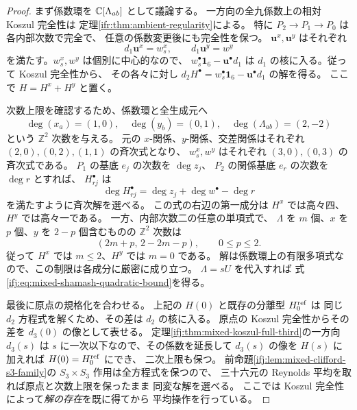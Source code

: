 \begin{proof}
まず係数環を $\mathbb C[\Lambda_{ab}]$ として議論する。
一方向の全九係数上の相対 Koszul 完全性は
定理\ref{ifr:thm:ambient-regularity}による。
特に $P_2\to P_1\to P_0$ は各内部次数で完全で、
任意の係数変更後にも完全性を保つ。
$\mathbf u^x,\mathbf u^y$ はそれぞれ
\[
 d_1\mathbf u^x=w_s^x,\qquad d_1\mathbf u^y=w^y
\]
を満たす。$w_s^x,w^y$ は個別に中心的なので、
$w_s^\bullet\mathbf1_6-\mathbf u^\bullet d_1$ は
$d_1$ の核に入る。従って Koszul 完全性から、
その各々に対し $d_2H^\bullet
 =w_s^\bullet\mathbf1_6-\mathbf u^\bullet d_1$ の解を得る。
ここで $H=H^x+H^y$ と置く。

次数上限を確認するため、係数環と全生成元へ
\[
 \deg(x_a)=(1,0),\quad \deg(y_b)=(0,1),\quad
 \deg(\Lambda_{ab})=(2,-2)
\]
という $\mathbb Z^2$ 次数を与える。
元の $x$-関係、$y$-関係、交差関係はそれぞれ
$(2,0),(0,2),(1,1)$ の斉次式となり、
$w_s^x,w^y$ はそれぞれ $(3,0),(0,3)$ の斉次式である。
$P_1$ の基底 $e_j$ の次数を $\deg z_j$、
$P_2$ の関係基底 $e_r$ の次数を $\deg r$ とすれば、
$H^\bullet_{rj}$ は
\[
  \deg H^\bullet_{rj}
       =\deg z_j+\deg w^\bullet-\deg r
\]
を満たすように斉次解を選べる。
この式の右辺の第一成分は $H^x$ では高々四、
$H^y$ では高々一である。
一方、内部次数二の任意の単項式で、
$\Lambda$ を $m$ 個、$x$ を $p$ 個、$y$ を $2-p$ 個含むものの
$\mathbb Z^2$ 次数は
\[
                    (2m+p,\,2-2m-p),
                    \qquad 0\le p\le2.
\]
従って $H^x$ では $m\le2$、$H^y$ では $m=0$ である。
解は係数環上の有限多項式なので、この制限は各成分に厳密に成り立つ。
$\Lambda=sU$ を代入すれば
式\eqref{ifj:eq:mixed-shamash-quadratic-bound}を得る。

最後に原点の規格化を合わせる。
上記の $H(0)$ と既存の分離型 $H_0^{\rm ref}$ は
同じ $d_2$ 方程式を解くため、その差は $d_2$ の核に入る。
原点の Koszul 完全性からその差を $d_3(0)$ の像として表せる。
定理\ref{ifj:thm:mixed-koszul-full-third}の一方向 $d_3(s)$ は
$s$ に一次以下なので、その係数を延長して $d_3(s)$ の像を
$H(s)$ に加えれば $H(0)=H_0^{\rm ref}$ にでき、
二次上限も保つ。
前命題\ref{ifj:lem:mixed-clifford-s3-family}の
$S_3\times S_3$ 作用は全方程式を保つので、
三十六元の Reynolds 平均を取れば原点と次数上限を保ったまま
同変な解を選べる。
ここでは Koszul 完全性によって\emph{解の存在}を既に得てから
平均操作を行っている。
\end{proof}

